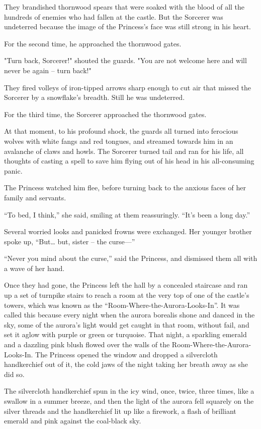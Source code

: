 They brandished thornwood spears that were soaked with the blood of all the hundreds of enemies who had fallen at the castle. But the Sorcerer was undeterred because the image of the Princess's face was still strong in his heart. 

For the second time, he approached the thornwood gates. 

"Turn back, Sorcerer!" shouted the guards. "You are not welcome here and will never be again – turn back!" 

They fired volleys of iron-tipped arrows sharp enough to cut air that missed the Sorcerer by a snowflake's breadth. Still he was undeterred. 

For the third time, the Sorcerer approached the thornwood gates. 

At that moment, to his profound shock, the guards all turned into ferocious wolves with white fangs and red tongues, and streamed towards him in an avalanche of claws and howls. The Sorcerer turned tail and ran for his life, all thoughts of casting a spell to save him flying out of his head in his all-consuming panic. 

The Princess watched him flee, before turning back to the anxious faces of her family and servants. 

“To bed, I think,” she said, smiling at them reassuringly. “It’s been a long day.”

Several worried looks and panicked frowns were exchanged. Her younger brother spoke up, “But… but, sister – the curse—” 

“Never you mind about the curse,” said the Princess, and dismissed them all with a wave of her hand.

Once they had gone, the Princess left the hall by a concealed staircase and ran up a set of turnpike stairs to reach a room at the very top of one of the castle’s towers, which was known as the “Room-Where-the-Aurora-Looks-In”. It was called this because every night when the aurora borealis shone and danced in the sky, some of the aurora’s light would get caught in that room, without fail, and set it aglow with purple or green or turquoise. That night, a sparkling emerald and a dazzling pink blush flowed over the walls of the Room-Where-the-Aurora-Looks-In. The Princess opened the window and dropped a silvercloth handkerchief out of it, the cold jaws of the night taking her breath away as she did so. 

The silvercloth handkerchief spun in the icy wind, once, twice, three times, like a swallow in a summer breeze, and then the light of the aurora fell squarely on the silver threads and the handkerchief lit up like a firework, a flash of brilliant emerald and pink against the coal-black sky. 

